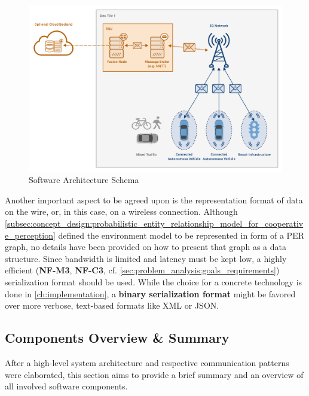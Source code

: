 \begin{figure}
	\centering
	\includegraphics[width=1\linewidth]{98_images/architecture}
	\caption{Software Architecture Schema}
	\label{fig:architecture}
\end{figure}

\par
\bigskip

Another important aspect to be agreed upon is the representation format of data on the wire, or, in this case, on a wireless connection. Although \cref{subsec:concept_design:probabilistic_entity_relationship_model_for_cooperative_perception} defined the environment model to be represented in form of a PER graph, no details have been provided on how to present that graph as a data structure. Since bandwidth is limited and latency must be kept low, a highly efficient (\textbf{NF-M3}, \textbf{NF-C3}, cf. \cref{sec:problem_analysis:goals_requirements}) serialization format should be used. While the choice for a concrete technology is done in \cref{ch:implementation}, a \textbf{binary serialization format} might be favored over more verbose, text-based formats like XML or JSON.


\subsection{Components Overview \& Summary}
\label{subsec:concept_design:components_overview}
After a high-level system architecture and respective communication patterns were elaborated, this section aims to provide a brief summary and an overview of all involved software components.

